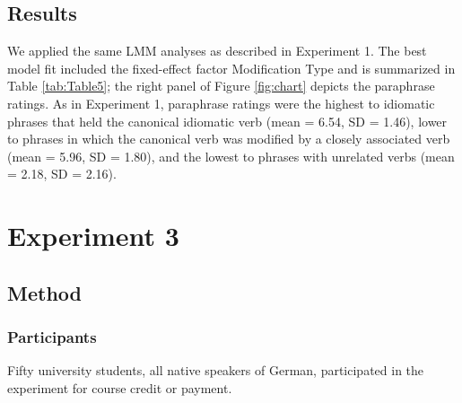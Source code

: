 \documentclass[output=paper]{langsci/langscibook}
\begin{document}
\begin{table}
\caption{Fixed effects of the predictors in the linear mixed-effect model for the paraphrase ratings in Experiment 2. \textit{Note.} significance code: *** < 0.0001, * < 0.05.\label{tab:Table5}}
\end{table}


\subsection{Results}
We applied the same LMM analyses as described in Experiment 1. The best model fit included the fixed-effect factor Modification Type and is summarized in Table \ref{tab:Table5}; the right panel of Figure \ref{fig:chart} depicts the paraphrase ratings. As in Experiment 1, paraphrase ratings were the highest to idiomatic phrases that held the canonical idiomatic verb (mean = 6.54, SD = 1.46), lower to phrases in which the canonical verb was modified by a closely associated verb (mean = 5.96, SD = 1.80), and the lowest to phrases with unrelated verbs (mean = 2.18, SD = 2.16). 

\section{Experiment 3}
\subsection{Method}
\subsubsection{Participants}

Fifty university students, all native speakers of German, participated in the experiment for course credit or payment.
\end{document}
